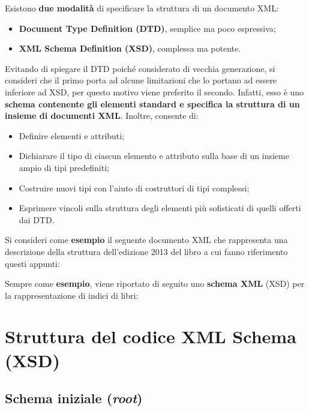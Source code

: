 \documentclass[a4paper]{article}
\begin{document}
	\noindent
	Esistono \textbf{due modalità} di specificare la struttura di un documento XML:
	\begin{itemize}
		\item \textcolor{Red3}{\textbf{Document Type Definition (DTD)}}, semplice ma poco espressiva;
		\item \textcolor{Red3}{\textbf{XML Schema Definition (XSD)}}, complessa ma potente.
	\end{itemize}
	Evitando di spiegare il DTD poiché considerato di vecchia generazione, si consideri che il primo porta ad alcune limitazioni che lo portano ad essere inferiore ad XSD, per questo motivo viene preferito il secondo. Infatti, esso è uno \textbf{schema contenente gli elementi standard e specifica la struttura di un insieme di documenti XML}. Inoltre, consente di:
	\begin{itemize}
		\item Definire elementi e attributi;
		
		\item Dichiarare il tipo di ciascun elemento e attributo sulla base di un insieme ampio di tipi predefiniti;
		
		\item Costruire nuovi tipi con l'aiuto di costruttori di tipi complessi;
		
		\item Esprimere vincoli sulla struttura degli elementi più sofisticati di quelli offerti dai DTD.
	\end{itemize}
	Si consideri come \textcolor{Green4}{\textbf{esempio}} il seguente documento XML che rappresenta una descrizione della struttura dell'edizione 2013 del libro a cui fanno riferimento questi appunti:
	
	Sempre come \textcolor{Green4}{\textbf{esempio}}, viene riportato di seguito uno \textbf{schema XML} (XSD) per la rappresentazione di indici di libri:
	\newpage
	
	\section{Struttura del codice XML Schema (XSD)}
	
	\subsection{Schema iniziale (\emph{root})}
	
\end{document}
